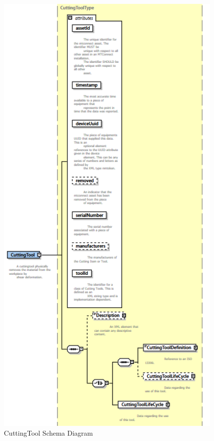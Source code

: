 \begin{figure}[ht]
  \centering
    \includegraphics[width=1.0\textwidth]{figures/CuttingTool Schema.png}
  \caption{CuttingTool Schema Diagram}
  \label{fig:CuttingTool Schema Diagram}
\end{figure}

